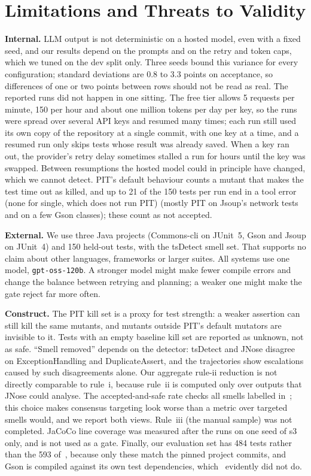 \section{Limitations and Threats to Validity}\label{sec:threats}

\textbf{Internal.} LLM output is not deterministic on a hosted model, even with a fixed seed, and our results depend on the prompts and on the retry and token caps, which we tuned on the dev split only.
Three seeds bound this variance for every configuration; standard deviations are 0.8 to 3.3 points on acceptance, so differences of one or two points between rows should not be read as real.
The reported runs did not happen in one sitting. The free tier allows 5 requests per minute, 150 per hour and about one million tokens per day per key, so the runs were spread over several API keys and resumed many times; each run still used its own copy of the repository at a single commit, with one key at a time, and a resumed run only skips tests whose result was already saved. When a key ran out, the provider's retry delay sometimes stalled a run for hours until the key was swapped. Between resumptions the hosted model could in principle have changed, which we cannot detect.
PIT's default behaviour counts a mutant that makes the test time out as killed, and up to 21 of the 150 tests per run end in a tool error (none for \textsf{single}, which does not run PIT) (mostly PIT on Jsoup's network tests and on a few Gson classes); these count as not accepted.

\textbf{External.} We use three Java projects (Commons-cli on JUnit~5, Gson and Jsoup on JUnit~4) and 150 held-out tests, with the tsDetect smell set. That supports no claim about other languages, frameworks or larger suites.
All systems use one model, \texttt{gpt-oss-120b}. A stronger model might make fewer compile errors and change the balance between retrying and planning; a weaker one might make the gate reject far more often.

\textbf{Construct.} The PIT kill set is a proxy for test strength: a weaker assertion can still kill the same mutants, and mutants outside PIT's default mutators are invisible to it. Tests with an empty baseline kill set are reported as unknown, not as safe.
``Smell removed'' depends on the detector: tsDetect and JNose disagree on ExceptionHandling and DuplicateAssert, and the trajectories show escalations caused by such disagreements alone. Our aggregate rule-ii reduction is not directly comparable to rule~i, because rule~ii is computed only over outputs that JNose could analyse.
The accepted-and-safe rate checks all smells labelled in~\cite{utrefactor}; this choice makes consensus targeting look worse than a metric over targeted smells would, and we report both views. Rule~iii (the manual sample) was not completed. JaCoCo line coverage was measured after the runs on one seed of \textsf{s3} only, and is not used as a gate.
Finally, our evaluation set has 484 tests rather than the 593 of~\cite{utrefactor}, because only these match the pinned project commits, and Gson is compiled against its own test dependencies, which~\cite{utrefactor} evidently did not do.


